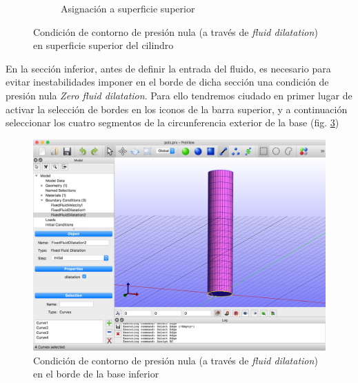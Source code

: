 \begin{figure}[!ht]
\begin{subfigure}[b]{0.48\textwidth}
\caption{Asignación a superficie superior}
\label{fig:pre-04-b}
\end{subfigure}
\caption{Condición de contorno de presión nula (a través de \emph{fluid dilatation}) en superficie superior del cilindro}
\label{fig:pre-04-ab}
\end{figure}

En la sección inferior, antes de definir la entrada del fluido, es necesario para evitar inestabilidades imponer en el borde de dicha sección una condición de presión nula \emph{Zero fluid dilatation}.
Para ello tendremos ciudado en primer lugar de activar la selección de bordes en los iconos de la barra superior, y a continuación seleccionar los cuatro segmentos de la circunferencia exterior de la base (fig. \ref{fig:pre-04-c})
\begin{figure}[!ht]
\centering
\includegraphics[width=0.48\linewidth]{figuras_4/04_pre-bc-zfd-3.png}
\caption{Condición de contorno de presión nula (a través de \emph{fluid dilatation}) en el borde de la base inferior}
\label{fig:pre-04-c}
\end{figure}

